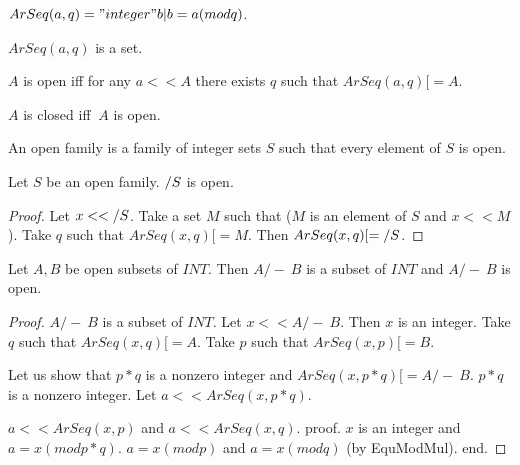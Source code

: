 \documentclass{article}
\begin{document}
  \begin{forthel}

    \begin{definition}[ArSeq]
      $ArSeq(a,q) = { "integer" b | b = a (mod q) }$.
    \end{definition}

    \begin{lemma}
      $ArSeq(a,q)$ is a set.
    \end{lemma}

    \begin{definition}[Open]
      $A$ is open iff for any $a << A$ there exists $q$ such that $ArSeq(a,q) [= A$.
    \end{definition}

    \begin{definition}[Closed]
      $A$ is closed iff $~A$ is open.
    \end{definition}

    \begin{definition}[OpenIntegerSets]
      An open family is a family of integer sets $S$ such that every element of $S$ is open.
    \end{definition}

    \begin{lemma}[UnionOpen]
      Let $S$ be an open family. $\-/ S$ is open.
    \end{lemma}
    \begin{proof}
      Let $x << \-/ S$. Take a set $M$ such that ($M$ is an element of $S$ and $x << M$). Take $q$ such that $ArSeq(x,q) [= M$. Then $ArSeq(x,q) [= \-/ S$.
    \end{proof}

    \begin{lemma}[InterOpen]
      Let $A,B$ be open subsets of $INT$. Then $A /-\ B$ is a subset of $INT$ and $A /-\ B$ is open.
    \end{lemma}
    \begin{proof}
      $A /-\ B$ is a subset of $INT$. Let $x << A /-\ B$. Then $x$ is an integer. Take $q$ such that $ArSeq(x,q) [= A$. Take $p$ such that $ArSeq(x,p) [= B$.

      Let us show that $p*q$ is a nonzero integer and $ArSeq(x, p * q) [= A /-\ B$.
        $p*q$ is a nonzero integer. Let $a << ArSeq(x, p * q)$.

        $a << ArSeq (x, p)$ and $a << ArSeq (x, q)$.
        proof.
          $x$ is an integer and $a = x (mod p * q)$. $a = x (mod p)$ and $a = x (mod q)$ (by EquModMul).
        end.


\end{proof}
\end{forthel}
\end{document}

